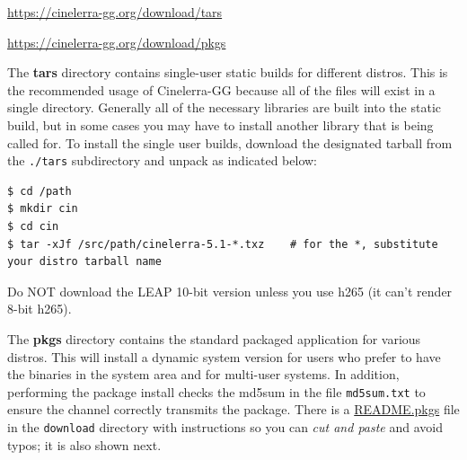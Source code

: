 {\small \url{https://cinelerra-gg.org/download/tars}
	
	\url{https://cinelerra-gg.org/download/pkgs}}

The \textbf{tars} directory contains single-user static builds for different distros.  
This is the recommended usage of Cinelerra-GG because all of the files will exist in a single directory.
Generally all of the necessary libraries are built into the static build, but in some cases you may
have to install another library that is being called for.  
To install the single user builds, download the designated tarball from the \texttt{./tars} subdirectory and unpack as indicated below:

\begin{lstlisting}[numbers=none]
$ cd /path
$ mkdir cin
$ cd cin
$ tar -xJf /src/path/cinelerra-5.1-*.txz    # for the *, substitute your distro tarball name
\end{lstlisting}

Do NOT download the LEAP 10-bit version unless you use h265 (it can't render 8-bit h265).

The \textbf{pkgs} directory contains the standard packaged application for various distros.  
This will install a dynamic system version for users who prefer to have the binaries in the system area and for multi-user systems.  
In addition, performing the package install checks the md5sum in the file \texttt{md5sum.txt} to ensure the channel correctly transmits the package.  
There is a {\small \href{https://cinelerra-gg.org/download/README.pkgs}{README.pkgs}} file in the \texttt{download} directory with instructions so you can \textit{ cut and paste} and avoid typos; it is also shown next.

